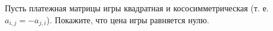 Пусть платежная матрицы игры квадратная и кососимметрическая (т. е. $a_{i, j} = -a_{j, i}$). Покажите, что цена игры
равняется нулю.